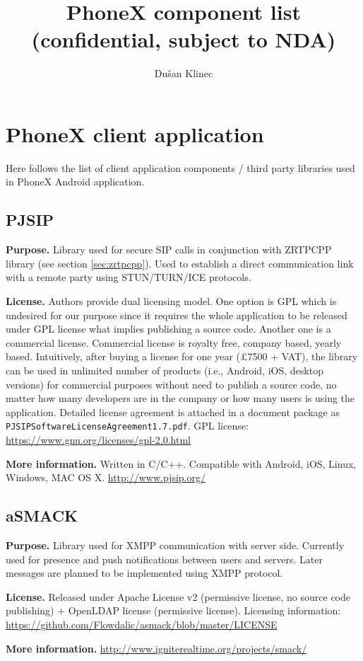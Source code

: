 \documentclass[a4paper,10pt]{article}
\title{PhoneX component list \\ (confidential, subject to NDA)}
\author{Du\v{s}an Klinec}
\begin{document}
\maketitle

\section{PhoneX client application}
Here follows the list of client application components / third party libraries used in PhoneX Android application.

\subsection{PJSIP}\label{sec:pjsip}
\par\smallskip\noindent\textbf{Purpose.} Library used for secure SIP calls in conjunction with ZRTPCPP library (see section \ref{sec:zrtpcpp}). 
Used to establish a direct communication link with a remote party using STUN/TURN/ICE protocols.

\par\smallskip\noindent\textbf{License.} Authors provide dual licensing model. One option is GPL which is undesired for our purpose 
since it requires the whole application to be released under GPL license what implies publishing a source code. 
Another one is a commercial license. Commercial license is royalty free, company based, yearly based.
Intuitively, after buying a license for one year (\pounds 7500 + VAT), the library can be used in unlimited number 
of products (i.e., Android, iOS, desktop versions) for commercial purposes without need to publish a source code, 
no matter how many developers are in the company or how many users is using the application. Detailed license agreement 
is attached in a document package as \verb|PJSIPSoftwareLicenseAgreement1.7.pdf|. GPL license: \\ \url{https://www.gnu.org/licenses/gpl-2.0.html}
\par\smallskip\noindent\textbf{More information.} Written in C/C++. Compatible with Android, iOS, Linux, Windows, MAC OS X. \url{http://www.pjsip.org/}

\subsection{aSMACK}
\par\smallskip\noindent\textbf{Purpose.} Library used for XMPP communication with server side. Currently used for presence and push 
notifications between users and servers. Later messages are planned to be implemented using XMPP protocol.
\par\smallskip\noindent\textbf{License.} Released under Apache License v2 (permissive license, no source code publishing) + OpenLDAP license (permissive license).
Licensing information: \url{https://github.com/Flowdalic/asmack/blob/master/LICENSE}
\par\smallskip\noindent\textbf{More information.} \url{http://www.igniterealtime.org/projects/smack/}
\end{document}
